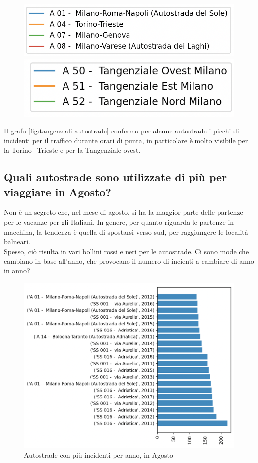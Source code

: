 \documentclass[a4paper]{report}
\begin{document}
\begin{figure}
    \includegraphics[width=0.6\linewidth]{../src/incidenti/incidenti_aci/autostrade/legenda_autostrade.png}
    \includegraphics[width=0.45\linewidth]{../src/incidenti/incidenti_aci/autostrade/legenda_tangenziali.png}
\end{figure}

Il grafo \ref{fig:tangenziali-autostrade} conferma per alcune autostrade i picchi di 
incidenti per il traffico durante orari di punta, 
in particolare è molto visibile per la Torino$-$Trieste e per la Tangenziale ovest.


\subsection{Quali autostrade sono utilizzate di più per viaggiare in Agosto?}

Non è un segreto che, nel mese di agosto, si ha la maggior parte delle partenze per le vacanze per 
gli Italiani. In genere, per quanto riguarda le partenze in macchina, la tendenza è quella di spostarsi verso sud, 
per raggiungere le località balneari.\\
Spesso, ciò risulta in vari bollini rossi e neri per le autostrade. 
Ci sono mode che cambiano in base all'anno, 
che provocano il numero di incienti a cambiare di anno in anno? 

\begin{figure}
    \includegraphics[width=\linewidth]{../src/incidenti/incidenti_aci/agosto/autostrade_anno_agosto.png}
    \caption{Autostrade con più incidenti per anno, in Agosto}
    \label{fig:autostrade-anno-agosto}
\end{figure}
\end{document}
